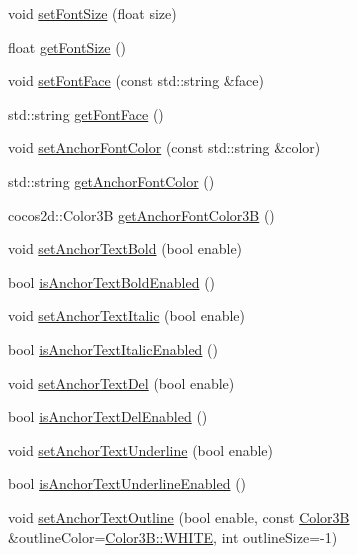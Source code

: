 \begin{DoxyCompactItemize}
void \hyperlink{classui_1_1RichText_a45a5d5e1f075648230019b8d1400df87}{set\+Font\+Size} (float size)
\item 
float \hyperlink{classui_1_1RichText_a9b6f6464318fdeaf139161f169560c53}{get\+Font\+Size} ()
\item 
void \hyperlink{classui_1_1RichText_aece9d280930f5c88b721838dc414f6e9}{set\+Font\+Face} (const std\+::string \&face)
\item 
std\+::string \hyperlink{classui_1_1RichText_af3bbdb1b6e2c5ea81cefcfcadc760acd}{get\+Font\+Face} ()
\item 
void \hyperlink{classui_1_1RichText_a60ebf6b715a3c538ce8a4c77c979b305}{set\+Anchor\+Font\+Color} (const std\+::string \&color)
\item 
std\+::string \hyperlink{classui_1_1RichText_a3d776737d4159673aab16af9b46d19e6}{get\+Anchor\+Font\+Color} ()
\item 
cocos2d\+::\+Color3B \hyperlink{classui_1_1RichText_a79706c4385b96017aa5c504f4881b0a9}{get\+Anchor\+Font\+Color3B} ()
\item 
void \hyperlink{classui_1_1RichText_a35bade50d3042d9c5c63ae3d8e61fb78}{set\+Anchor\+Text\+Bold} (bool enable)
\item 
bool \hyperlink{classui_1_1RichText_a823f58bcacdb897d067e3fb6ab7b06d0}{is\+Anchor\+Text\+Bold\+Enabled} ()
\item 
void \hyperlink{classui_1_1RichText_a0b7b72f39b363b3ab4bf99d623464123}{set\+Anchor\+Text\+Italic} (bool enable)
\item 
bool \hyperlink{classui_1_1RichText_affb8bc75d84245bd768c23a9b9f635a5}{is\+Anchor\+Text\+Italic\+Enabled} ()
\item 
void \hyperlink{classui_1_1RichText_ab9d69f1f319f4c28620ebf7fed1246ff}{set\+Anchor\+Text\+Del} (bool enable)
\item 
bool \hyperlink{classui_1_1RichText_acf4f6b2e493d468a372bfea93c4cde54}{is\+Anchor\+Text\+Del\+Enabled} ()
\item 
void \hyperlink{classui_1_1RichText_a5a435489915c1e0d98fb4f53382ec6e0}{set\+Anchor\+Text\+Underline} (bool enable)
\item 
bool \hyperlink{classui_1_1RichText_aaa284641d098978d7b548c57afcc930a}{is\+Anchor\+Text\+Underline\+Enabled} ()
\item 
\mbox{\label{classui_1_1RichText_aa68c15b36eeba056f623a567ef532994}} 
void \hyperlink{classui_1_1RichText_aa68c15b36eeba056f623a567ef532994}{set\+Anchor\+Text\+Outline} (bool enable, const \hyperlink{structColor3B}{Color3B} \&outline\+Color=\hyperlink{structColor3B_adf57cb86ca15f434b29215ad471cdc35}{Color3\+B\+::\+W\+H\+I\+TE}, int outline\+Size=-\/1)

\end{DoxyCompactItemize}
